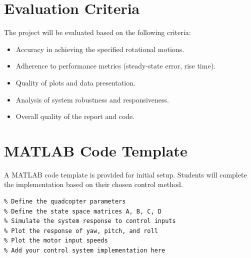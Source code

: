 \documentclass[12pt]{article}
\begin{document}
\section{Evaluation Criteria}
The project will be evaluated based on the following criteria:
\begin{itemize}
    \item [-] [30\%] Accuracy in achieving the specified rotational motions.
    \item [-] [20\%] Adherence to performance metrics (steady-state error, rise time).
    \item [-] [20\%] Quality of plots and data presentation.
    \item [-] [10\%] Analysis of system robustness and responsiveness.
    \item [-] [20\%] Overall quality of the report and code.
\end{itemize}

\section{MATLAB Code Template}
A MATLAB code template is provided for initial setup. Students will complete the implementation based on their chosen control method.

\begin{verbatim}
% Define the quadcopter parameters
% Define the state space matrices A, B, C, D
% Simulate the system response to control inputs
% Plot the response of yaw, pitch, and roll
% Plot the motor input speeds
% Add your control system implementation here
\end{verbatim}
\end{document}
